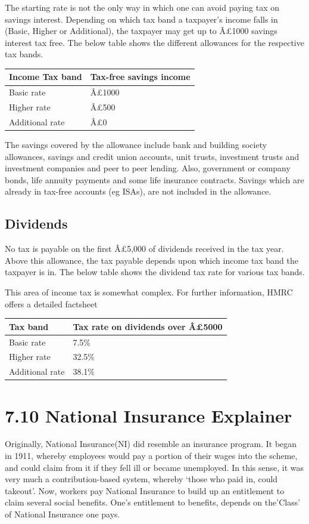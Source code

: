 \documentclass[]{tufte-handout}
\begin{document}
The starting rate is not the only way in which one can avoid paying tax
on savings interest. Depending on which tax band a taxpayer's income
falls in (Basic, Higher or Additional), the taxpayer may get up to
Â£1000 savings interest tax free. The below table shows the different
allowances for the respective tax bands.

\begin{longtable}[]{@{}ll@{}}
\toprule
Income Tax band & Tax-free savings income\tabularnewline
\midrule
\endhead
Basic rate & Â£1000\tabularnewline
Higher rate & Â£500\tabularnewline
Additional rate & Â£0\tabularnewline
\bottomrule
\end{longtable}

The savings covered by the allowance include bank and building society
allowances, savings and credit union accounts, unit trusts, investment
trusts and investment companies and peer to peer lending. Also,
government or company bonds, life annuity payments and some life
insurance contracts. Savings which are already in tax-free accounts (eg
ISAs), are not included in the allowance.

\hypertarget{dividends}{%
\subsection{Dividends}\label{dividends}}

No tax is payable on the first Â£5,000 of dividends received in the tax
year. Above this allowance, the tax payable depends upon which income
tax band the taxpayer is in. The below table shows the dividend tax rate
for various tax bands.

This area of income tax is somewhat complex. For further information,
HMRC offers a detailed factsheet

\begin{longtable}[]{@{}ll@{}}
\toprule
Tax band & Tax rate on dividends over Â£5000\tabularnewline
\midrule
\endhead
Basic rate & 7.5\%\tabularnewline
Higher rate & 32.5\%\tabularnewline
Additional rate & 38.1\%\tabularnewline
\bottomrule
\end{longtable}

\hypertarget{national-insurance-explainer}{%
\section{7.10 National Insurance
Explainer}\label{national-insurance-explainer}}

Originally, National Insurance(NI) did resemble an insurance program. It
began in 1911, whereby employees would pay a portion of their wages into
the scheme, and could claim from it if they fell ill or became
unemployed. In this sense, it was very much a contribution-based system,
whereby `those who paid in, could takeout'. Now, workers pay National
Insurance to build up an entitlement to claim several social benefits.
One's entitlement to benefits, depends on the'Class' of National
Insurance one pays.
\end{document}
